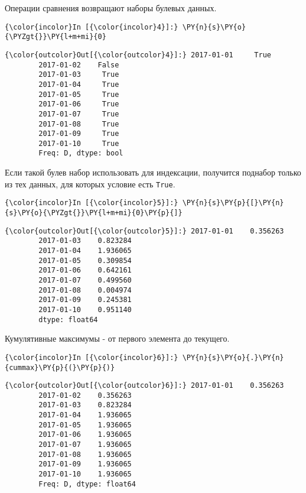     Операции сравнения возвращают наборы булевых данных.

    \begin{Verbatim}[commandchars=\\\{\}]
{\color{incolor}In [{\color{incolor}4}]:} \PY{n}{s}\PY{o}{\PYZgt{}}\PY{l+m+mi}{0}
\end{Verbatim}

            \begin{Verbatim}[commandchars=\\\{\}]
{\color{outcolor}Out[{\color{outcolor}4}]:} 2017-01-01     True
        2017-01-02    False
        2017-01-03     True
        2017-01-04     True
        2017-01-05     True
        2017-01-06     True
        2017-01-07     True
        2017-01-08     True
        2017-01-09     True
        2017-01-10     True
        Freq: D, dtype: bool
\end{Verbatim}
        
    Если такой булев набор использовать для индексации, получится поднабор
только из тех данных, для которых условие есть \texttt{True}.

    \begin{Verbatim}[commandchars=\\\{\}]
{\color{incolor}In [{\color{incolor}5}]:} \PY{n}{s}\PY{p}{[}\PY{n}{s}\PY{o}{\PYZgt{}}\PY{l+m+mi}{0}\PY{p}{]}
\end{Verbatim}

            \begin{Verbatim}[commandchars=\\\{\}]
{\color{outcolor}Out[{\color{outcolor}5}]:} 2017-01-01    0.356263
        2017-01-03    0.823284
        2017-01-04    1.936065
        2017-01-05    0.309854
        2017-01-06    0.642161
        2017-01-07    0.499560
        2017-01-08    0.004974
        2017-01-09    0.245381
        2017-01-10    0.951140
        dtype: float64
\end{Verbatim}
        
    Кумулятивные максимумы - от первого элемента до текущего.

    \begin{Verbatim}[commandchars=\\\{\}]
{\color{incolor}In [{\color{incolor}6}]:} \PY{n}{s}\PY{o}{.}\PY{n}{cummax}\PY{p}{(}\PY{p}{)}
\end{Verbatim}

            \begin{Verbatim}[commandchars=\\\{\}]
{\color{outcolor}Out[{\color{outcolor}6}]:} 2017-01-01    0.356263
        2017-01-02    0.356263
        2017-01-03    0.823284
        2017-01-04    1.936065
        2017-01-05    1.936065
        2017-01-06    1.936065
        2017-01-07    1.936065
        2017-01-08    1.936065
        2017-01-09    1.936065
        2017-01-10    1.936065
        Freq: D, dtype: float64
\end{Verbatim}
        
